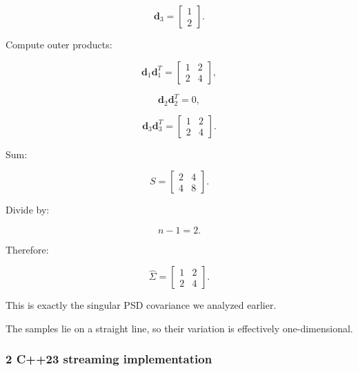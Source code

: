 \[
 \mathbf d_3= \begin{bmatrix}1\\2\end{bmatrix}.
\]

Compute outer products:

\[
 \mathbf d_1\mathbf d_1^T= \begin{bmatrix}1&2\\2&4\end{bmatrix},
\]

\[
 \mathbf d_2\mathbf d_2^T=0,
\]

\[
 \mathbf d_3\mathbf d_3^T= \begin{bmatrix}1&2\\2&4\end{bmatrix}.
\]

Sum:

\[
 S= \begin{bmatrix} 2&4\\4&8 \end{bmatrix}.
\]

Divide by:

\[
 n-1=2.
\]

Therefore:

\[
 \boxed{ \widehat\Sigma= \begin{bmatrix} 1&2\\ 2&4 \end{bmatrix} }.
\]

This is exactly the singular PSD covariance we analyzed earlier.

The samples lie on a straight line, so their variation is effectively one-dimensional.

\subsubsection{2 C++23 streaming implementation}\label{02-foundations-ii-ch031-c23-streaming-implementation}

\hypertarget{02-foundations-ii-ch031-c23-streaming-implementation}{}

